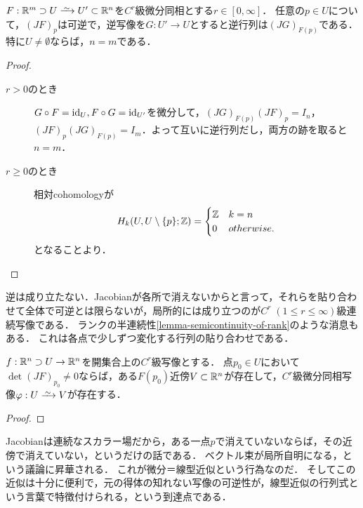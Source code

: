 \documentclass[uplatex,dvipdfmx]{jsreport}
\begin{document}
\begin{lemma}[微分同相ならばJacobianは消えない]\label{lemma-Jacobi-matrix-of-diffeomorphism}
    $F:\R^m\supset U\iso U'\subset\R^n$を$C^r$級微分同相とする$r\in[0,\infty]$．
    任意の$p\in U$について，$(JF)_p$は可逆で，逆写像を$G:U'\to U$とすると逆行列は$(JG)_{F(p)}$である．
    特に$U\ne\emptyset$ならば，$n=m$である．
\end{lemma}
\begin{proof}\mbox{}
    \begin{description}
        \item[$r>0$のとき] $G\circ F=\mathrm{id}_{U},F\circ G=\mathrm{id}_{U'}$を微分して，$(JG)_{F(p)}(JF)_p=I_n$，$(JF)_p(JG)_{F(p)}=I_m$．よって互いに逆行列だし，両方の跡を取ると$n=m$．
        \item[$r\ge 0$のとき] 相対cohomologyが
        \[H_k(U,U\setminus\{p\};\mathbb{Z})=\begin{cases}
            \mathbb{Z}&k=n\\
            0&otherwise.
        \end{cases}\]
        となることより．
    \end{description}
\end{proof}
\begin{remark}
    逆は成り立たない．Jacobianが各所で消えないからと言って，それらを貼り合わせて全体で可逆とは限らないが，局所的には成り立つのが$C^r\;(1\le r\le\infty)$級連続写像である．
    ランクの半連続性\ref{lemma-semicontinuity-of-rank}のような消息もある．
    これは各点で少しずつ変化する行列の貼り合わせである．
\end{remark}

\begin{theorem}\label{thm-inverse-mapping-theorem}
    $f:\mathbb{R}^n\supset U\to\mathbb{R}^n$を開集合上の$C^r$級写像とする．
    点$p_0\in U$において$\det(JF)_{p_0}\ne 0$ならば，ある$F(p_0)$近傍$V\subset\mathbb{R}^n$が存在して，$C^r$級微分同相写像$\varphi:U\iso V$が存在する．
\end{theorem}
\begin{proof}
    
\end{proof}
\begin{remarks}[逆関数定理の立ち位置]
    Jacobianは連続なスカラー場だから，ある一点$p$で消えていないならば，その近傍で消えていない，というだけの話である．
    ベクトル束が局所自明になる，という議論に昇華される．
    これが微分＝線型近似という行為なのだ．
    そしてこの近似は十分に便利で，元の得体の知れない写像の可逆性が，線型近似の行列式という言葉で特徴付けられる，という到達点である．
\end{remarks}
\end{document}
